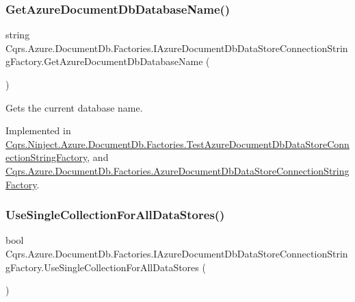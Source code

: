 \subsubsection{\texorpdfstring{Get\+Azure\+Document\+Db\+Database\+Name()}{GetAzureDocumentDbDatabaseName()}}
{\footnotesize\ttfamily string Cqrs.\+Azure.\+Document\+Db.\+Factories.\+I\+Azure\+Document\+Db\+Data\+Store\+Connection\+String\+Factory.\+Get\+Azure\+Document\+Db\+Database\+Name (\begin{DoxyParamCaption}{ }\end{DoxyParamCaption})}



Gets the current database name. 



Implemented in \hyperlink{classCqrs_1_1Ninject_1_1Azure_1_1DocumentDb_1_1Factories_1_1TestAzureDocumentDbDataStoreConnectionStringFactory_ab4b864396b790819609d3337dfb3f75d_ab4b864396b790819609d3337dfb3f75d}{Cqrs.\+Ninject.\+Azure.\+Document\+Db.\+Factories.\+Test\+Azure\+Document\+Db\+Data\+Store\+Connection\+String\+Factory}, and \hyperlink{classCqrs_1_1Azure_1_1DocumentDb_1_1Factories_1_1AzureDocumentDbDataStoreConnectionStringFactory_a2a30d6066e2bc9c4af078b1f0a5407ab_a2a30d6066e2bc9c4af078b1f0a5407ab}{Cqrs.\+Azure.\+Document\+Db.\+Factories.\+Azure\+Document\+Db\+Data\+Store\+Connection\+String\+Factory}.

\mbox{\label{interfaceCqrs_1_1Azure_1_1DocumentDb_1_1Factories_1_1IAzureDocumentDbDataStoreConnectionStringFactory_ae500b0191fee202806701e4f856c43dd_ae500b0191fee202806701e4f856c43dd}} 
\subsubsection{\texorpdfstring{Use\+Single\+Collection\+For\+All\+Data\+Stores()}{UseSingleCollectionForAllDataStores()}}
{\footnotesize\ttfamily bool Cqrs.\+Azure.\+Document\+Db.\+Factories.\+I\+Azure\+Document\+Db\+Data\+Store\+Connection\+String\+Factory.\+Use\+Single\+Collection\+For\+All\+Data\+Stores (\begin{DoxyParamCaption}{ }\end{DoxyParamCaption})}



